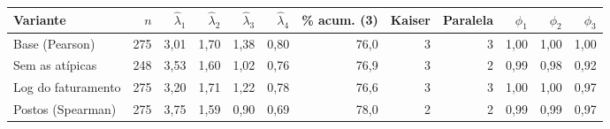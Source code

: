 \begin{tabular}{lrrrrrrrrrrr}
\toprule
Variante & $n$ & $\hat\lambda_1$ & $\hat\lambda_2$ & $\hat\lambda_3$ & $\hat\lambda_4$ & \% acum. (3) & Kaiser & Paralela & $\phi_1$ & $\phi_2$ & $\phi_3$ \\
\midrule
Base (Pearson) & 275 & 3,01 & 1,70 & 1,38 & 0,80 & 76,0 & 3 & 3 & 1,00 & 1,00 & 1,00 \\
Sem as atípicas & 248 & 3,53 & 1,60 & 1,02 & 0,76 & 76,9 & 3 & 2 & 0,99 & 0,98 & 0,92 \\
Log do faturamento & 275 & 3,20 & 1,71 & 1,22 & 0,78 & 76,6 & 3 & 3 & 1,00 & 1,00 & 0,97 \\
Postos (Spearman) & 275 & 3,75 & 1,59 & 0,90 & 0,69 & 78,0 & 2 & 2 & 0,99 & 0,99 & 0,97 \\
\bottomrule
\end{tabular}
